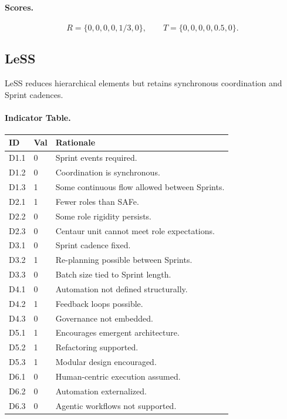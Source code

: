 \documentclass[11pt, a4paper, twocolumn]{article} %
\begin{document}
\paragraph{Scores.}

\[
R = \{0,0,0,0,1/3,0\},\qquad
T = \{0,0,0,0,0.5,0\}.
\]

\newpage
\subsection*{LeSS}

LeSS \citep{larman2017less} reduces hierarchical elements but retains synchronous
coordination and Sprint cadences.

\paragraph{Indicator Table.}

\begin{table}[h]
\centering
\begin{tabular}{llp{10.5cm}}
\toprule
\textbf{ID} & \textbf{Val} & \textbf{Rationale} \\
\midrule
D1.1 & 0 & Sprint events required. \\
D1.2 & 0 & Coordination is synchronous. \\
D1.3 & 1 & Some continuous flow allowed between Sprints. \\
\midrule
D2.1 & 1 & Fewer roles than SAFe. \\
D2.2 & 0 & Some role rigidity persists. \\
D2.3 & 0 & Centaur unit cannot meet role expectations. \\
\midrule
D3.1 & 0 & Sprint cadence fixed. \\
D3.2 & 1 & Re-planning possible between Sprints. \\
D3.3 & 0 & Batch size tied to Sprint length. \\
\midrule
D4.1 & 0 & Automation not defined structurally. \\
D4.2 & 1 & Feedback loops possible. \\
D4.3 & 0 & Governance not embedded. \\
\midrule
D5.1 & 1 & Encourages emergent architecture. \\
D5.2 & 1 & Refactoring supported. \\
D5.3 & 1 & Modular design encouraged. \\
\midrule
D6.1 & 0 & Human-centric execution assumed. \\
D6.2 & 0 & Automation externalized. \\
D6.3 & 0 & Agentic workflows not supported. \\
\bottomrule
\end{tabular}
\end{table}
\end{document}
